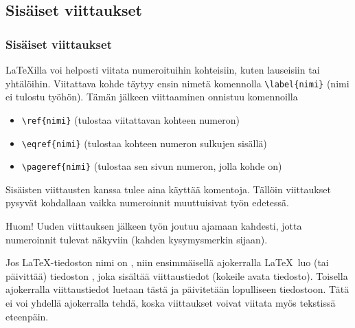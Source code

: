 \subsection{Sisäiset viittaukset}
\begin{frame}[fragile]
    \frametitle{Sisäiset viittaukset}
    \LaTeX illa voi helposti viitata numeroituihin kohteisiin, kuten lauseisiin tai yhtälöihin. Viitattava kohde täytyy ensin nimetä komennolla \lstinline-\label{nimi}- (nimi ei tulostu työhön). Tämän jälkeen viittaaminen onnistuu komennoilla 
    \begin{itemize}
        \item \lstinline-\ref{nimi}- (tulostaa viitattavan kohteen numeron)
        \item \lstinline-\eqref{nimi}- (tulostaa kohteen numeron sulkujen sisällä)
        \item \lstinline-\pageref{nimi}- (tulostaa sen sivun numeron, jolla kohde on)  
    \end{itemize}
    Sisäisten viittausten kanssa tulee aina käyttää komentoja. Tällöin viittaukset pysyvät kohdallaan vaikka numeroinnit muuttuisivat työn edetessä.
\end{frame}

\begin{frame}[fragile]
    Huom! Uuden viittauksen jälkeen työn joutuu ajamaan kahdesti, jotta numeroinnit tulevat näkyviin (kahden kysymysmerkin sijaan).
    \begin{extra}
        Jos \LaTeX-tiedoston nimi on , niin ensimmäisellä ajokerralla \LaTeX\ luo (tai päivittää) tiedoston , joka sisältää viittaustiedot (kokeile avata tiedosto). Toisella ajokerralla viittaustiedot luetaan tästä ja päivitetään lopulliseen tiedostoon. Tätä ei voi yhdellä ajokerralla tehdä, koska viittaukset voivat viitata myös tekstissä eteenpäin.
    \end{extra}
    
\end{frame}


